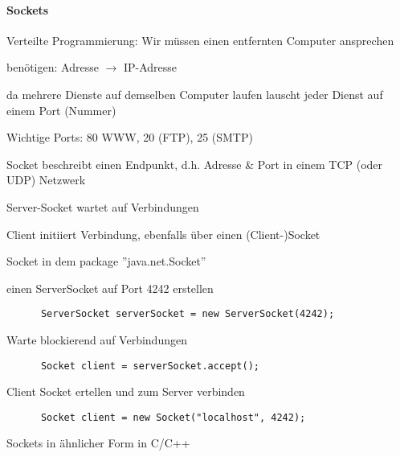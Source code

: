 \documentclass[10pt]{article}
\begin{document}
\begin{itemize*}
\paragraph{Sockets}
\begin{itemize*}
  \item Verteilte Programmierung: Wir müssen einen entfernten Computer ansprechen
  \item benötigen: Adresse $\rightarrow$ IP-Adresse
  \item da mehrere Dienste auf demselben Computer laufen lauscht jeder Dienst auf einem Port (Nummer)
  \begin{itemize*}
    \item Wichtige Ports: 80 WWW, 20 (FTP), 25 (SMTP)
  \end{itemize*}
  \item Socket beschreibt einen Endpunkt, d.h. Adresse \& Port in einem TCP (oder UDP) Netzwerk
  \item Server-Socket wartet auf Verbindungen
  \item Client initiiert Verbindung, ebenfalls über einen (Client-)Socket
\end{itemize*}

Socket in dem package ''java.net.Socket''
\begin{itemize*}
  \item einen ServerSocket auf Port 4242 erstellen
  \begin{lstlisting} 
      ServerSocket serverSocket = new ServerSocket(4242); 
    \end{lstlisting}
  \item Warte blockierend auf Verbindungen
  \begin{lstlisting} 
      Socket client = serverSocket.accept(); 
    \end{lstlisting}
  \item Client Socket ertellen und zum Server verbinden
  \begin{lstlisting} 
      Socket client = new Socket("localhost", 4242); 
    \end{lstlisting}
  \item Sockets in ähnlicher Form in C/C++
\end{itemize*}


\end{itemize*}
\end{document}
